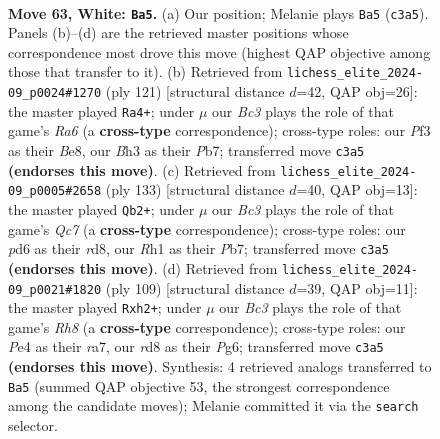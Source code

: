 \documentclass[11pt]{article}
\begin{document}
\clearpage

\begin{figure}[p]\centering
\begin{subfigure}{0.46\textwidth}\centering
\resizebox{\linewidth}{!}{%
\newchessgame
\chessboard[
  setfen={3r4/4b3/pn1p2kp/4p3/4P2p/2B2P1B/5K2/7R w - - 2 63},
  showmover=false,
  pgfstyle=straightmove, color=movearrow, markmove={c3-a5}
]}
\caption{}
\end{subfigure}\hfill
\begin{subfigure}{0.46\textwidth}\centering
\resizebox{\linewidth}{!}{%
\newchessgame
\chessboard[
  setfen={3kb3/1p6/1P6/2RPpN2/2K1Pb2/r4Bp1/6P1/8 b - - 4 61},
  showmover=false,
  pgfstyle=straightmove, color=movearrow, markmove={a3-a4}
]}
\caption{}
\end{subfigure}
\\[4pt]
\begin{subfigure}{0.46\textwidth}\centering
\resizebox{\linewidth}{!}{%
\newchessgame
\chessboard[
  setfen={3R4/1p3b2/5P1k/p1p1K3/P5BP/1P3R2/2q5/8 b - - 16 67},
  showmover=false,
  pgfstyle=straightmove, color=movearrow, markmove={c2-b2}
]}
\caption{}
\end{subfigure}\hfill
\begin{subfigure}{0.46\textwidth}\centering
\resizebox{\linewidth}{!}{%
\newchessgame
\chessboard[
  setfen={4k3/R7/1p2p1p1/2b1B2p/P3P3/1P4P1/2K4P/7r b - - 0 55},
  showmover=false,
  pgfstyle=straightmove, color=movearrow, markmove={h1-h2}
]}
\caption{}
\end{subfigure}
\caption{\textbf{Move 63, White: \texttt{Ba5}.} (a) Our position; Melanie plays \texttt{Ba5} (\texttt{c3a5}). Panels (b)--(d) are the retrieved master positions whose correspondence most drove this move (highest QAP objective among those that transfer to it). (b) Retrieved from \texttt{lichess\_elite\_2024-09\_p0024\#1270} (ply 121) [structural distance $d$=42, QAP obj=26]: the master played \texttt{Ra4+}; under $\mu$ our \emph{Bc3} plays the role of that game's \emph{Ra6} (a \textbf{cross-type} correspondence); cross-type roles: our \emph{P}f3 as their \emph{B}e8, our \emph{B}h3 as their \emph{P}b7; transferred move \texttt{c3a5} \textbf{(endorses this move)}. (c) Retrieved from \texttt{lichess\_elite\_2024-09\_p0005\#2658} (ply 133) [structural distance $d$=40, QAP obj=13]: the master played \texttt{Qb2+}; under $\mu$ our \emph{Bc3} plays the role of that game's \emph{Qc7} (a \textbf{cross-type} correspondence); cross-type roles: our \emph{p}d6 as their \emph{r}d8, our \emph{R}h1 as their \emph{P}b7; transferred move \texttt{c3a5} \textbf{(endorses this move)}. (d) Retrieved from \texttt{lichess\_elite\_2024-09\_p0021\#1820} (ply 109) [structural distance $d$=39, QAP obj=11]: the master played \texttt{Rxh2+}; under $\mu$ our \emph{Bc3} plays the role of that game's \emph{Rh8} (a \textbf{cross-type} correspondence); cross-type roles: our \emph{P}e4 as their \emph{r}a7, our \emph{r}d8 as their \emph{P}g6; transferred move \texttt{c3a5} \textbf{(endorses this move)}. Synthesis: 4 retrieved analogs transferred to \texttt{Ba5} (summed QAP objective 53, the strongest correspondence among the candidate moves); Melanie committed it via the \texttt{search} selector.}
\label{fig:thought-m124}
\end{figure}
\end{document}
